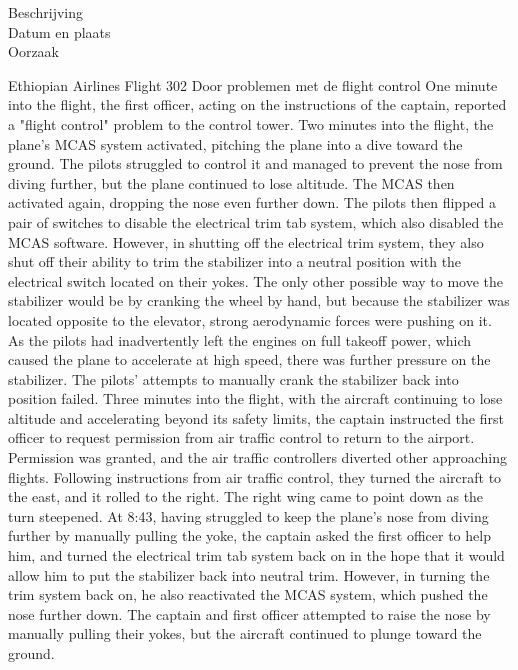 	\begin{description}
	\item[Beschrijving]
	\item[Datum en plaats] 
	\item[Oorzaak]
\end{description}
Ethiopian Airlines Flight 302
Door problemen met de flight control
One minute into the flight, the first officer, acting on the instructions of the captain, reported a "flight control" problem to the control tower.
Two minutes into the flight, the plane's MCAS system activated, pitching the plane into a dive toward the ground. The pilots struggled to control it and managed to prevent the nose from diving further, but the plane continued to lose altitude.
The MCAS then activated again, dropping the nose even further down. The pilots then flipped a pair of switches to disable the electrical trim tab system, which also disabled the MCAS software. However, in shutting off the electrical trim system, they also shut off their ability to trim the stabilizer into a neutral position with the electrical switch located on their yokes. The only other possible way to move the stabilizer would be by cranking the wheel by hand, but because the stabilizer was located opposite to the elevator, strong aerodynamic forces were pushing on it.
As the pilots had inadvertently left the engines on full takeoff power, which caused the plane to accelerate at high speed, there was further pressure on the stabilizer. The pilots' attempts to manually crank the stabilizer back into position failed.
Three minutes into the flight, with the aircraft continuing to lose altitude and accelerating beyond its safety limits, the captain instructed the first officer to request permission from air traffic control to return to the airport. Permission was granted, and the air traffic controllers diverted other approaching flights. Following instructions from air traffic control, they turned the aircraft to the east, and it rolled to the right. The right wing came to point down as the turn steepened.
At 8:43, having struggled to keep the plane's nose from diving further by manually pulling the yoke, the captain asked the first officer to help him, and turned the electrical trim tab system back on in the hope that it would allow him to put the stabilizer back into neutral trim. However, in turning the trim system back on, he also reactivated the MCAS system, which pushed the nose further down. The captain and first officer attempted to raise the nose by manually pulling their yokes, but the aircraft continued to plunge toward the ground.

